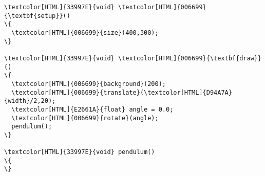 \begin{Verbatim}[commandchars=\\\{\}]
\textcolor[HTML]{33997E}{void} \textcolor[HTML]{006699}{\textbf{setup}}()
\{
  \textcolor[HTML]{006699}{size}(400,300);
\}

\textcolor[HTML]{33997E}{void} \textcolor[HTML]{006699}{\textbf{draw}}()
\{
  \textcolor[HTML]{006699}{background}(200);
  \textcolor[HTML]{006699}{translate}(\textcolor[HTML]{D94A7A}{width}/2,20);
  \textcolor[HTML]{E2661A}{float} angle = 0.0;
  \textcolor[HTML]{006699}{rotate}(angle);
  pendulum();
\}

\textcolor[HTML]{33997E}{void} pendulum()
\{
\}

\end{Verbatim}
